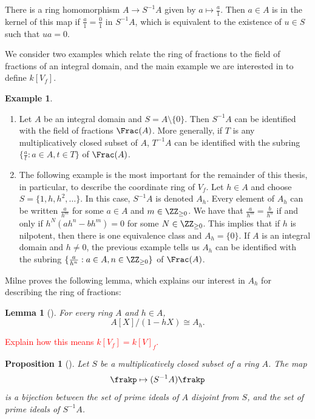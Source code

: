 \documentclass[12pt]{amsart}
\theoremstyle{plain}
\newtheorem{lemma}[theorem]{Lemma}
\newtheorem{proposition}[theorem]{Proposition}
\theoremstyle{definition}
\newtheorem{example}[theorem]{Example}
\begin{document}
There is a ring homomorphism $A\to S^{-1}A$ given by $a \mapsto \frac{a}{1}$.
Then $a\in A$ is in the kernel of this map if $\frac{a}{1}=\frac{0}{1}$ in $S^{-1}A$, which is equivalent to the existence of $u\in S$ such that $u a = 0$.

We consider two examples which relate the ring of fractions to the field of fractions of an integral domain, and the main example we are interested in to define $k[V_f]$.

\begin{example}
\begin{enumerate}
\item
Let $A$ be an integral domain and $S = A \setminus \{0\}$.
Then $S^{-1}A$ can be identified with the field of fractions $\Frac(A)$.
More generally, if $T$ is any multiplicatively closed subset of $A$, $T^{-1}A$ can be identified with the subring $\{\frac{a}{t} : a\in A, t \in T\}$ of $\Frac(A)$.

\item
The following example is the most important for the remainder of this thesis, in particular, to describe the coordinate ring of $V_f$.
Let $h \in A$ and choose $S = \{1, h, h^2, \ldots\}$.
In this case, $S^{-1}A$ is denoted $A_h$.
Every element of $A_h$ can be written $\frac{a}{h^m}$ for some $a \in A$ and $m \in \ZZ_{\ge 0}$.
We have that $\frac{a}{h^m} = \frac{b}{h^n}$ if and only if $h^N (ah^n - b h^m)=0$ for some $N \in \ZZ_{\ge 0}$.
This implies that if $h$ is nilpotent, then there is one equivalence class and $A_h = \{0\}$.
If $A$ is an integral domain and $h \ne 0$, the previous example tells us $A_h$ can be identified with the subring $\{\frac{a}{h^n} : a \in A, n \in \ZZ_{\ge 0}\}$ of $\Frac(A)$.
\end{enumerate}
\end{example}

Milne proves the following lemma, which explains our interest in $A_h$ for describing the ring of fractions:

\begin{lemma}[{\cite[Lemma 1.13]{Milne13}}]
For every ring $A$ and $h \in A$,
$$A[X]/(1-hX) \cong A_h.$$
\end{lemma}

\textcolor{red}{Explain how this means $k[V_f] = k[V]_f$.}

\begin{proposition}[{\cite[Proposition 1.14]{Milne13}}]\label{proposition:localizationideals}
Let $S$ be a multiplicatively closed subset of a ring $A$.
The map
$$\frakp \mapsto (S^{-1}A) \frakp$$
is a bijection between the set of prime ideals of $A$ disjoint from $S$, and the set of prime ideals of $S^{-1}A$.
\end{proposition}
\end{document}
